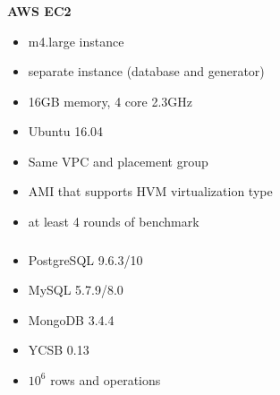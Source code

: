 \documentclass[usenames,dvipsnames, 18pt, compress, aspectratio=169]{beamer}
\begin{document}
%
\begin{frame}
    \frametitle{}
\end{frame}


\begin{frame}
    \frametitle{}
    \begin{center}
        \textbf{AWS EC2}
        \begin{itemize}[label={}]
            \item m4.large instance
            \item separate instance (database and generator)
            \item 16GB memory, 4 core 2.3GHz
            \item Ubuntu 16.04
            \item Same VPC and placement group
            \item AMI that supports HVM virtualization type
            \item at least 4 rounds of benchmark
        \end{itemize}
    \end{center}
\end{frame}

\begin{frame}
    \frametitle{}
    \begin{center}
        \begin{itemize}[label={}]
            \item PostgreSQL 9.6.3/10
            \item MySQL 5.7.9/8.0
            \item MongoDB 3.4.4
            \item YCSB 0.13
            \item $10^6$ rows and operations
        \end{itemize}
    \end{center}
\end{frame}
\end{document}
